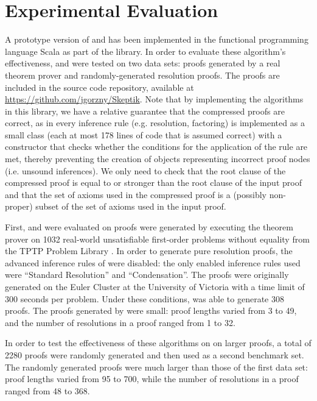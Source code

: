 \section{Experimental Evaluation} \label{sec:exp}

A prototype version of  {\GFOLU} and {\FORPI} has been implemented in the functional programming language Scala as part of the \skeptik library. 
In order to evaluate these algorithm's effectiveness,  {\GFOLU} and {\FORPI} were tested on two data sets: proofs generated by a real theorem prover and randomly-generated resolution proofs. 
The proofs are included in the source code repository, available at \url{https://github.com/jgorzny/Skeptik}. 
Note that by implementing the algorithms in this library, we have a relative guarantee that the compressed proofs are correct, as in \skeptik every inference rule (e.g. resolution, factoring) is implemented as a small class (each at most 178 lines of code that is assumed correct) with a constructor that checks whether the conditions for the application of the rule are met, thereby preventing the creation of objects representing incorrect proof nodes (i.e. unsound inferences). 
We only need to check that the root clause of the compressed proof is equal to or stronger than the root clause of the input proof and that the set of axioms used in the compressed proof is a (possibly non-proper) subset of the set of axioms used in the input proof.

First, {\GFOLU} and {\FORPI} were evaluated on proofs were generated by executing the {\SPASS} theorem prover \cite{Spass} on 1032 real-world unsatisfiable first-order problems without equality from the TPTP Problem Library \cite{TPTP}. 
In order to generate pure resolution proofs, the advanced inference rules of {\SPASS} were disabled: the only enabled inference rules used were ``Standard Resolution'' and ``Condensation''. 
The proofs were originally generated on the Euler Cluster at the University of Victoria with a time limit of 300 seconds per problem. 
Under these conditions, {\SPASS} was able to generate 308 proofs. 
The proofs generated by {\SPASS} were small: proof lengths varied from 3 to 49, and the number of resolutions in a proof ranged from 1 to 32.

In order to test the effectiveness of these algorithms on on larger proofs, a total of 2280 proofs were randomly generated and then used as a second benchmark set. 
The randomly generated proofs were much larger than those of the first data set: proof lengths varied from 95 to 700, while the number of resolutions in a proof ranged from 48 to 368.

